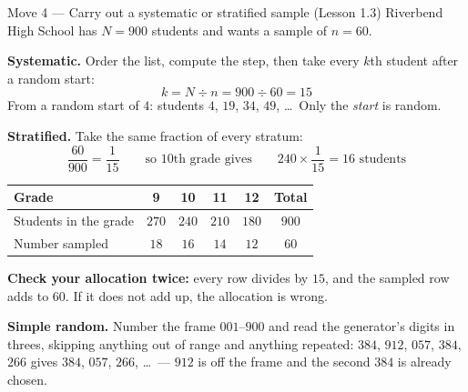 \documentclass[10pt]{article}
\begin{document}
\vspace{3pt}
\boxguard[16]
\begin{notesbox}{Move 4 --- Carry out a systematic or stratified sample (Lesson 1.3)}
\small
Riverbend High School has $N = 900$ students and wants a sample of $n = 60$.

\vspace{2pt}
\textbf{Systematic.} Order the list, compute the step, then take every $k$th student after a
random start:
\[ k = N \div n = 900 \div 60 = 15 \]
From a random start of $4$: students $4$, $19$, $34$, $49$, \dots\ Only the \emph{start} is
random.

\vspace{3pt}
\textbf{Stratified.} Take the same fraction of every stratum:
\[ \frac{60}{900} = \frac{1}{15} \qquad\text{so 10th grade gives}\qquad
   240 \times \frac{1}{15} = 16 \text{ students} \]

\vspace{-2pt}
\renewcommand{\arraystretch}{1.2}
\begin{tabularx}{\linewidth}{@{} X c c c c | c @{}}
\rowcolor{frost}
\textbf{Grade} & \textbf{9} & \textbf{10} & \textbf{11} & \textbf{12} & \textbf{Total} \\
\midrule
Students in the grade & $270$ & $240$ & $210$ & $180$ & $900$ \\
Number sampled & $18$ & $16$ & $14$ & $12$ & $60$ \\
\end{tabularx}

\vspace{3pt}
\textbf{Check your allocation twice:} every row divides by $15$, and the sampled row adds to
$60$. If it does not add up, the allocation is wrong.

\vspace{3pt}
\textbf{Simple random.} Number the frame $001$--$900$ and read the generator's digits in
threes, skipping anything out of range and anything repeated: $384$, $912$, $057$, $384$,
$266$ gives $384$, $057$, $266$, \dots\ --- $912$ is off the frame and the second $384$ is
already chosen.
\end{notesbox}
\end{document}
